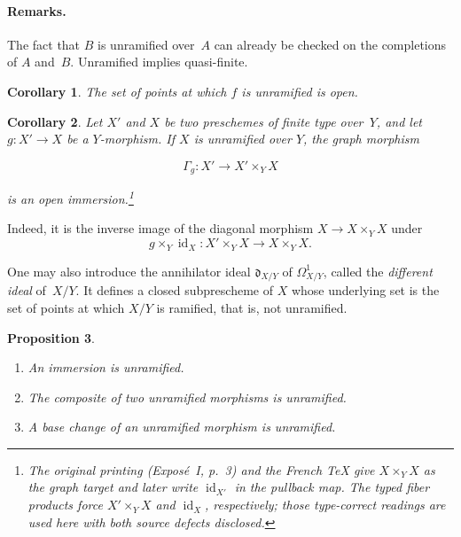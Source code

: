 \documentclass[11pt,oneside]{amsbook}
\newtheorem{proposition}{Proposition}[section]
\newtheorem{corollary}[proposition]{Corollary}
\begin{document}
\paragraph{Remarks.}
The fact that
\(B\) is unramified over~\(A\) can already be checked on the completions of
\(A\) and~\(B\).  Unramified implies quasi-finite.

\begin{corollary}
\label{I.3.3}
The set of points at which \(f\) is unramified is open.
\end{corollary}

\begin{corollary}
\label{I.3.4}
Let \(X'\) and \(X\) be two preschemes of finite type over~\(Y\), and let
\(g\colon X'\to X\) be a \(Y\)-morphism.  If \(X\) is unramified over
\(Y\), the graph morphism

\[
  \Gamma_g\colon X'\longrightarrow X'\times_Y X
\]

is an open immersion.\footnote{The original printing (Expos\'e~I, p.~3) and
the French TeX give \(X\times_Y X\) as the graph target and later write
\(\operatorname{id}_{X'}\) in the pullback map.  The typed fiber products
force \(X'\times_Y X\) and \(\operatorname{id}_X\), respectively; those
type-correct readings are used here with both source defects disclosed.}
\end{corollary}

Indeed, it is the inverse image of the diagonal morphism
\(X\to X\times_Y X\) under
\[
g\times_Y\operatorname{id}_{X}\colon
X'\times_Y X\longrightarrow X\times_Y X.
\]

One may also introduce the annihilator ideal
\(\mathfrak d_{X/Y}\)\label{indnot:af} of \(\Omega^1_{X/Y}\), called the
\emph{different ideal} of~\(X/Y\).  It defines a closed subprescheme of
\(X\) whose underlying set is the set of points at which \(X/Y\) is
ramified, that is, not unramified.

\begin{proposition}
\label{I.3.5}
\begin{enumerate}
\item[(i)] An immersion is unramified.
\item[(ii)] The composite of two unramified morphisms is unramified.
\item[(iii)] A base change of an unramified morphism is unramified.
\end{enumerate}
\end{proposition}
\end{document}
